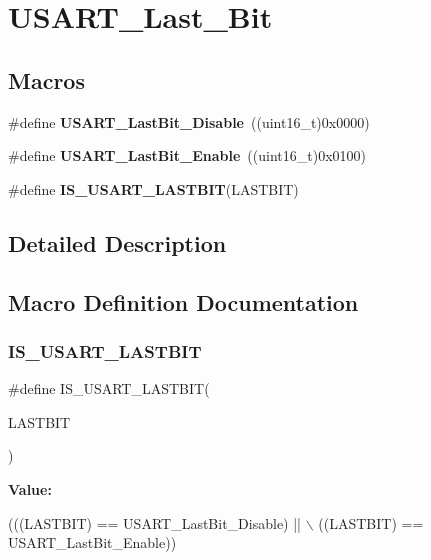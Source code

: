 \hypertarget{group___u_s_a_r_t___last___bit}{}\section{U\+S\+A\+R\+T\+\_\+\+Last\+\_\+\+Bit}
\label{group___u_s_a_r_t___last___bit}
\subsection*{Macros}
\begin{DoxyCompactItemize}
\item 
\mbox{\label{group___u_s_a_r_t___last___bit_ga129c89b9e0dbb3ce43ee92589b3324e5}} 
\#define {\bfseries U\+S\+A\+R\+T\+\_\+\+Last\+Bit\+\_\+\+Disable}~((uint16\+\_\+t)0x0000)
\item 
\mbox{\label{group___u_s_a_r_t___last___bit_gaf8c19d1ce01c6efff8c24ee82cc7b52e}} 
\#define {\bfseries U\+S\+A\+R\+T\+\_\+\+Last\+Bit\+\_\+\+Enable}~((uint16\+\_\+t)0x0100)
\item 
\#define {\bfseries I\+S\+\_\+\+U\+S\+A\+R\+T\+\_\+\+L\+A\+S\+T\+B\+IT}(L\+A\+S\+T\+B\+IT)
\end{DoxyCompactItemize}


\subsection{Detailed Description}


\subsection{Macro Definition Documentation}
\mbox{\label{group___u_s_a_r_t___last___bit_gaa941695e5612b53e9c2aca6a9fa0d695}} 
\subsubsection{\texorpdfstring{I\+S\+\_\+\+U\+S\+A\+R\+T\+\_\+\+L\+A\+S\+T\+B\+IT}{IS\_USART\_LASTBIT}}
{\footnotesize\ttfamily \#define I\+S\+\_\+\+U\+S\+A\+R\+T\+\_\+\+L\+A\+S\+T\+B\+IT(\begin{DoxyParamCaption}\item[{}]{L\+A\+S\+T\+B\+IT }\end{DoxyParamCaption})}

{\bfseries Value\+:}
\begin{DoxyCode}
(((LASTBIT) == USART\_LastBit\_Disable) || \(\backslash\)
                                   ((LASTBIT) == USART\_LastBit\_Enable))
\end{DoxyCode}
